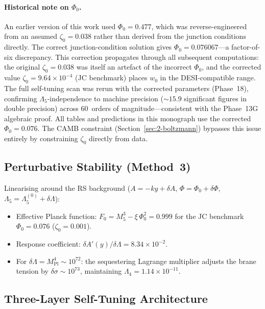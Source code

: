 \paragraph{Historical note on $\Phi_0$.} An earlier version of this work used $\Phi_0 = 0.477$, which was reverse-engineered from an assumed $\zeta_0 = 0.038$ rather than derived from the junction conditions directly.  The correct junction-condition solution gives $\Phi_0 = 0.076067$---a factor-of-six discrepancy.  This correction propagates through all subsequent computations: the original $\zeta_0 = 0.038$ was itself an artefact of the incorrect $\Phi_0$, and the corrected value $\zeta_0 = 9.64 \times 10^{-4}$ (JC benchmark) places $w_0$ in the DESI-compatible range.  The full self-tuning scan was rerun with the corrected parameters (Phase~18), confirming $\Lambda_5$-independence to machine precision (${\sim}15.9$ significant figures in double precision) across 60~orders of magnitude---consistent with the Phase~13G algebraic proof.  All tables and predictions in this monograph use the corrected $\Phi_0 = 0.076$.  The CAMB constraint (Section~\ref{sec:2-boltzmann}) bypasses this issue entirely by constraining $\zeta_0$ directly from data.

\subsection{Perturbative Stability (Method~3)}

Linearising around the RS background ($A = -ky + \delta A$, $\Phi = \Phi_0 + \delta\Phi$, $\Lambda_5 = \Lambda_5^{(0)} + \delta\Lambda$):
\begin{itemize}
\item Effective Planck function: $F_0 = M_5^3 - \xi\,\Phi_0^2 = 0.999$ for the JC benchmark $\Phi_0 = 0.076$ ($\zeta_0 = 0.001$).
\item Response coefficient: $\delta A'(y)/\delta\Lambda = 8.34 \times 10^{-2}$.
\item For $\delta\Lambda = M_{\mathrm{Pl}}^4 \sim 10^{72}$: the sequestering Lagrange multiplier adjusts the brane tension by $\delta\sigma \sim 10^{73}$, maintaining $\Lambda_4 = 1.14 \times 10^{-11}$.
\end{itemize}

\subsection{Three-Layer Self-Tuning Architecture}

